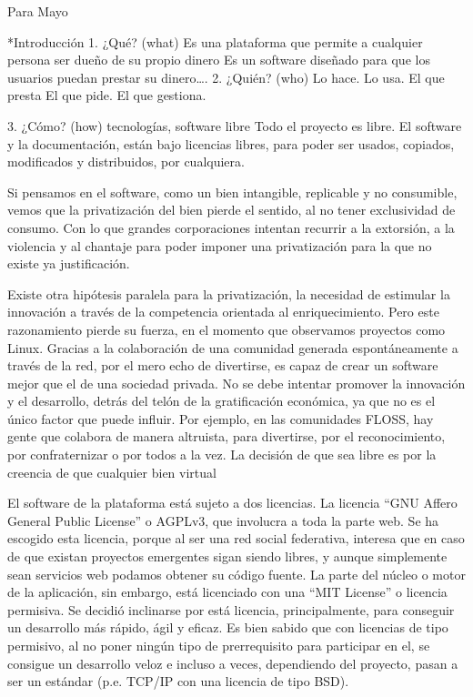 Para Mayo

*Introducción
1. ¿Qué? (what)
Es una plataforma que permite a cualquier persona ser dueño de su propio dinero
Es un software diseñado para que los usuarios puedan prestar su dinero….
2. ¿Quién? (who) 
Lo hace. 
Lo usa.
El que presta
El que pide.
El que gestiona.

3. ¿Cómo? (how)
tecnologías, software libre
Todo el proyecto es libre. El software y la documentación, están bajo licencias libres, para poder ser usados, copiados, modificados y distribuidos, por cualquiera.

Si pensamos en el software, como un bien intangible, replicable y no consumible, vemos que la privatización del bien pierde el sentido, al no tener exclusividad de consumo. Con lo que grandes corporaciones intentan recurrir a la extorsión, a la violencia y al chantaje para poder imponer una privatización para la que no existe ya justificación. \cite{Bifo Cap. Fraternidad, saber, no saber}

Existe otra hipótesis paralela para la privatización, la necesidad de estimular la innovación a través de la competencia orientada al enriquecimiento. Pero este razonamiento pierde su fuerza, en el momento que observamos proyectos como Linux. Gracias a la colaboración de una comunidad generada espontáneamente a través de la red, por el mero echo de divertirse, es capaz de crear un software mejor que el de una sociedad privada. No se debe intentar promover la innovación y el desarrollo, detrás del telón de la gratificación económica, ya que no es el único factor que puede influir. Por ejemplo, en las comunidades FLOSS, hay gente que colabora de manera altruista, para divertirse, por el reconocimiento, por confraternizar o por todos a la vez. \cite{Bifo Cap. Fraternidad, saber, no saber}
La decisión de que sea libre es por la creencia de que cualquier bien virtual

El software de la plataforma  está sujeto a dos licencias. La licencia ``GNU Affero General Public License'' o AGPLv3, que involucra a toda la parte web. Se ha escogido esta licencia, porque al ser una red social federativa, interesa que en caso de que existan proyectos emergentes sigan siendo libres, y aunque simplemente sean servicios web podamos obtener su código fuente. La parte del núcleo o motor de la aplicación, sin embargo, está licenciado con una ``MIT License'' o licencia permisiva. Se decidió inclinarse por está licencia, principalmente, para conseguir un desarrollo más rápido, ágil y eficaz. Es bien sabido que con licencias de tipo permisivo, al no poner ningún tipo de prerrequisito para participar en el, se consigue un desarrollo veloz e incluso a veces, dependiendo del proyecto, pasan a ser un estándar (p.e. TCP/IP con una licencia de tipo BSD). 

